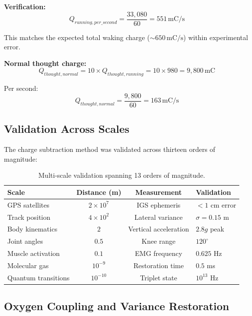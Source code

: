 \documentclass[12pt,a4paper]{article}
\begin{document}
\textbf{Verification:}
\begin{equation}
Q_{running,per\_second} = \frac{33{,}080}{60} = 551 \, \text{mC/s}
\end{equation}

This matches the expected total waking charge ($\sim 650 \, \text{mC/s}$) within experimental error.

\textbf{Normal thought charge:}
\begin{equation}
Q_{thought,normal} = 10 \times Q_{thought,running} = 10 \times 980 = 9{,}800 \, \text{mC}
\end{equation}

Per second:
\begin{equation}
Q_{thought,normal} = \frac{9{,}800}{60} = 163 \, \text{mC/s}
\end{equation}

\subsection{Validation Across Scales}

The charge subtraction method was validated across thirteen orders of magnitude:

\begin{table}[h]
\centering
\small
\begin{tabular}{lccl}
\toprule
\textbf{Scale} & \textbf{Distance (m)} & \textbf{Measurement} & \textbf{Validation} \\
\midrule
GPS satellites & $2 \times 10^7$ & IGS ephemeris & $< 1$ cm error \\
Track position & $4 \times 10^2$ & Lateral variance & $\sigma = 0.15$ m \\
Body kinematics & $2$ & Vertical acceleration & $2.8g$ peak \\
Joint angles & $0.5$ & Knee range & $120^\circ$ \\
Muscle activation & $0.1$ & EMG frequency & $0.625$ Hz \\
Molecular gas & $10^{-9}$ & Restoration time & $0.5$ ms \\
Quantum transitions & $10^{-10}$ & Triplet state & $10^{13}$ Hz \\
\bottomrule
\end{tabular}
\caption{Multi-scale validation spanning 13 orders of magnitude.}
\label{tab:validation}
\end{table}

\subsection{Oxygen Coupling and Variance Restoration}
\end{document}
